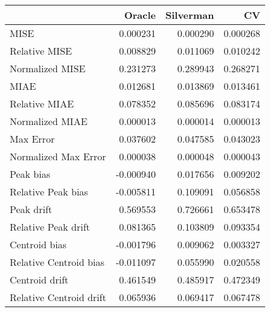 \begin{tabular}{lrrr}
  \hline
 & Oracle & Silverman & CV \\ 
  \hline
MISE & 0.000231 & 0.000290 & 0.000268 \\ 
  Relative MISE & 0.008829 & 0.011069 & 0.010242 \\ 
  Normalized MISE & 0.231273 & 0.289943 & 0.268271 \\ 
  MIAE & 0.012681 & 0.013869 & 0.013461 \\ 
  Relative MIAE & 0.078352 & 0.085696 & 0.083174 \\ 
  Normalized MIAE & 0.000013 & 0.000014 & 0.000013 \\ 
  Max Error & 0.037602 & 0.047585 & 0.043023 \\ 
  Normalized Max Error & 0.000038 & 0.000048 & 0.000043 \\ 
  Peak bias & -0.000940 & 0.017656 & 0.009202 \\ 
  Relative Peak bias & -0.005811 & 0.109091 & 0.056858 \\ 
  Peak drift & 0.569553 & 0.726661 & 0.653478 \\ 
  Relative Peak drift & 0.081365 & 0.103809 & 0.093354 \\ 
  Centroid bias & -0.001796 & 0.009062 & 0.003327 \\ 
  Relative Centroid bias & -0.011097 & 0.055990 & 0.020558 \\ 
  Centroid drift & 0.461549 & 0.485917 & 0.472349 \\ 
  Relative Centroid drift & 0.065936 & 0.069417 & 0.067478 \\ 
   \hline
\end{tabular}

